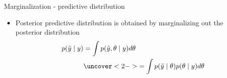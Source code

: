\documentclass[finnish,english,t]{beamer}
\begin{document}
\begin{frame}{Marginalization - predictive distribution}

  \begin{itemize}
  \item Posterior predictive distribution is obtained by marginalizing
    out the posterior distribution
      \begin{align*}
        p(\tilde{y} \mid y)  & = \int p(\tilde{y}, \theta \mid y) d\theta\\
                             & \uncover<2->{= \int p(\tilde{y} \mid \theta)p(\theta \mid y) d\theta}
      \end{align*}
    \end{itemize}

\end{frame}


  
\end{document}
